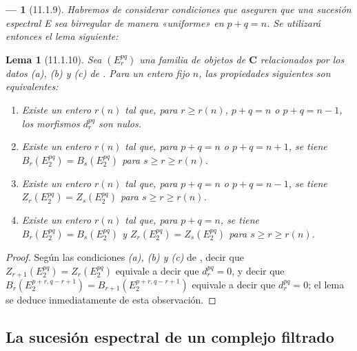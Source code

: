 \documentclass[10pt,oneside,openany]{book}
\theoremstyle{egaenv}\newtheorem*{env}{---}
\theoremstyle{egastatement}
\newtheorem*{lemma}{Lema}
\theoremstyle{egadescription}
\newcommand{\oldpage}[2][]{\marginnote{\normalfont\scriptsize\textbf{#1}\,|\,#2}\ignorespaces}
\renewcommand{\geq}{\geqslant}
\begin{document}
\begin{env}[11.1.9]
\label{0.11.1.9-fr}
Habremos de considerar condiciones que aseguren que una sucesión espectral E sea birregular de manera «uniforme» en $p+q=n$.
Se utilizará entonces el lema siguiente:
\end{env}

\begin{lemma}[11.1.10]
\label{0.11.1.10}
\label{0.11.1.10-fr}
Sea $(E_r^{pq})$ una familia de objetos de $\mathbf{C}$ relacionados por los datos \emph{(a)}, \emph{(b)} y \emph{(c)} de \textup{}.
Para un entero fijo $n$, las propiedades siguientes son equivalentes:
\begin{enumerate}
  \item[{\rm(a)}] Existe un entero $r(n)$ tal que, para $r\geq r(n)$, $p+q=n$ o $p+q=n-1$, los morfismos $d_r^{pq}$ son nulos.
  \item[{\rm(b)}] Existe un entero $r(n)$ tal que, para $p+q=n$ o $p+q=n+1$, se tiene $B_r(E_2^{pq})=B_s(E_2^{pq})$ para $s\geq r\geq r(n)$.
  \item[{\rm(c)}] Existe un entero $r(n)$ tal que, para $p+q=n$ o $p+q=n-1$, se tiene $Z_r(E_2^{pq})=Z_s(E_2^{pq})$ para $s\geq r\geq r(n)$.
  \item[{\rm(d)}] Existe un entero $r(n)$ tal que, para $p+q=n$, se tiene $B_r(E_2^{pq})=B_s(E_2^{pq})$ y $Z_r(E_2^{pq})=Z_s(E_2^{pq})$ para $s\geq r\geq r(n)$.
\end{enumerate}
\end{lemma}

\begin{proof}
\oldpage[0\textsubscript{III}]{27}
Según las condiciones \emph{(a), (b) y (c)} de , decir que $Z_{r+1}(E_2^{pq})=Z_r(E_2^{pq})$ equivale a decir que $d_r^{pq}=0$, y decir que $B_r(E_2^{p+r,q-r+1})=B_{r+1}(E_2^{p+r,q-r+1})$ equivale a decir que $d_r^{pq}=0$; el lema se deduce inmediatamente de esta observación.
\end{proof}

\subsection{La sucesión espectral de un complejo filtrado}
\label{subsection:0.11.2}
\label{subsection:0.11.2-fr}
\end{document}
